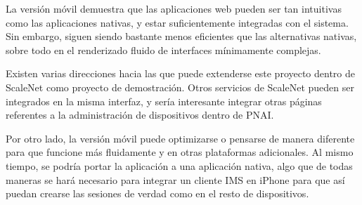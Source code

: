 La versión móvil demuestra que las aplicaciones web pueden ser tan intuitivas como las aplicaciones nativas, y estar suficientemente integradas con el sistema.
Sin embargo, siguen siendo bastante menos eficientes que las alternativas nativas, sobre todo en el renderizado fluido de interfaces mínimamente complejas.

Existen varias direcciones hacia las que puede extenderse este proyecto dentro de ScaleNet como proyecto de demostración.
Otros servicios de ScaleNet pueden ser integrados en la misma interfaz, y sería interesante integrar otras páginas referentes a la administración de dispositivos dentro de PNAI.

Por otro lado, la versión móvil puede optimizarse o pensarse de manera diferente para que funcione más fluidamente y en otras plataformas adicionales.
Al mismo tiempo, se podría portar la aplicación a una aplicación nativa, algo que de todas maneras se hará necesario para integrar un cliente IMS en iPhone para que así puedan crearse las sesiones de verdad como en el resto de dispositivos.
\nicechapterending
